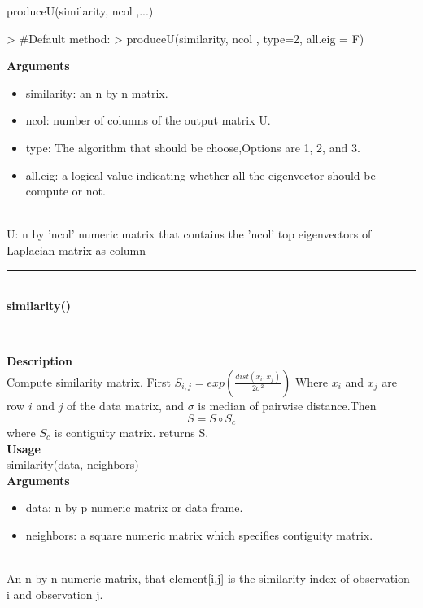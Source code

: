 \documentclass{article}
\begin{document}
produceU(similarity, ncol ,...)
\begin{Schunk}
\begin{Sinput}
> #Default method:
> produceU(similarity, ncol , type=2, all.eig = F)
\end{Sinput}
\end{Schunk}
{\bf Arguments}
\begin {itemize}
   \item similarity: an n by n matrix. 
   \item ncol: number of columns of the output matrix U.
   \item type: The algorithm that should be choose,Options are 1, 2, and 3.
   \item  all.eig: a logical value indicating whether all the eigenvector should be compute or not.
\end {itemize}    
\hspace*{5mm}{\bf Returns}\\
U: n by 'ncol' numeric matrix that contains the 'ncol' top eigenvectors of Laplacian matrix as column\\
\noindent\rule{14cm}{0.4pt}\\
{\bf \large similarity()} \\
\noindent\rule{14cm}{0.4pt}\\

{\bf Description}\\
Compute similarity matrix. First
$S_{i,j}= exp(\frac{dist(x_i,x_j)}{2\sigma ^2})$
Where $x_i$ and $x_j$ are row $i$ and $j$ of the data matrix, and  $\sigma$ is median of pairwise distance.Then 
$$S=S\circ S_c$$
where $S_c$ is contiguity matrix. returns S.\\

{\bf Usage}\\

similarity(data, neighbors)\\

{\bf Arguments}
\begin {itemize}
   \item data: n by p numeric matrix or data frame. 
   \item neighbors: a square numeric matrix which specifies contiguity matrix.
\end {itemize}    
\hspace*{5mm}{\bf Returns}\\
An n by n numeric matrix, that element[i,j] is the similarity index of observation i and observation j.\\ 
\end{document}

